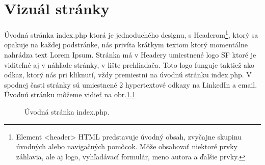 \chapter{Vizuál stránky}

Úvodná stránka index.php ktorá je jednoduchého designu, s Headerom\footnote[1]{Element <header> HTML predstavuje úvodný obsah, zvyčajne skupinu úvodných alebo navigačných pomôcok. Môže obsahovať niektoré prvky záhlavia, ale aj logo, vyhľadávací formulár, meno autora a ďalšie prvky.}, ktorý sa opakuje na každej podstránke, nás privíta krátkym textom ktorý momentálne nahrádza text Lorem Ipsum. Stránka má v Headery umiestnené logo SF ktoré je viditeľné aj v náhľade stránky, v lište prehliadača. Toto logo funguje taktiež ako odkaz, ktorý nás pri kliknutí, vždy premiestni na úvodnú stránku index.php. V spodnej časti stránky sú umiestnené 2 hypertextové odkazy na LinkedIn a email. Úvodnú stránku môžeme vidieť na obr.\ref{OBRAZOK 1.1}

\begin{figure}[!tbh]
\centering
\setlength{\fboxsep}{0pt}%
\setlength{\fboxrule}{1pt}%
\caption{Úvodná stránka index.php.}\label{OBRAZOK 1.1}
\end{figure}






